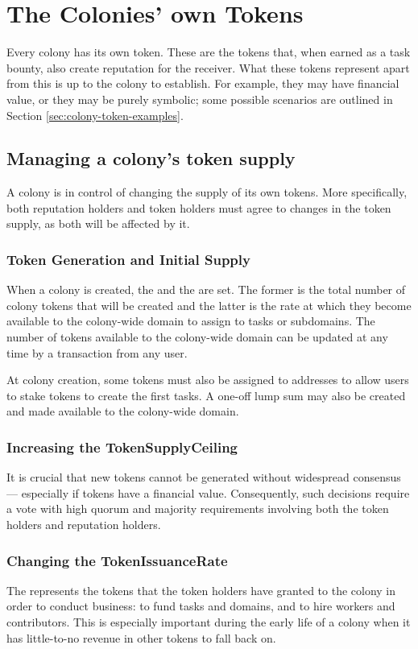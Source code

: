 \section{The Colonies' own Tokens}\label{sec:colony-tokens}
Every colony has its own token. These are the tokens that, when earned as a task bounty, also create reputation for the receiver. What these tokens represent apart from this is up to the colony to establish. For example, they may have financial value, or they may be purely symbolic; some possible scenarios are outlined in Section \ref{sec:colony-token-examples}.

\subsection{Managing a colony's token supply}\label{sec:colony-token-management}
A colony is in control of changing the supply of its own tokens. More specifically, both reputation holders and token holders must agree to changes in the token supply, as both will be affected by it.

\subsubsection{Token Generation and Initial Supply}
When a colony is created, the  and the  are set. The former is the total number of colony tokens that will be created and the latter is the rate at which they become available to the colony-wide domain to assign to tasks or subdomains. The number of tokens available to the colony-wide domain can be updated at any time by a transaction from any user.

At colony creation, some tokens must also be assigned to addresses to allow users to stake tokens to create the first tasks. A one-off lump sum may also be created and made available to the colony-wide domain.

\subsubsection{Increasing the TokenSupplyCeiling}
 It is crucial that new tokens cannot be generated without widespread consensus --- especially if tokens have a financial value. Consequently, such decisions require a vote with high quorum and majority requirements involving both the token holders and reputation holders. 

\subsubsection{Changing the TokenIssuanceRate}
The  represents the tokens that the token holders have granted to the colony in order to conduct business: to fund tasks and domains, and to hire workers and contributors. This is especially important during the early life of a colony when it has little-to-no revenue in other tokens to fall back on.

